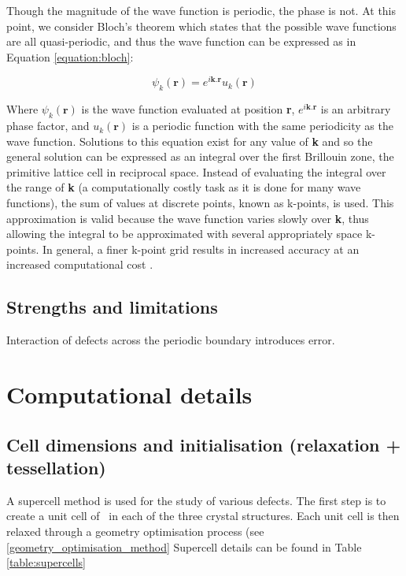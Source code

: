 Though the magnitude of the wave function is periodic, the phase is not. At this point, we consider Bloch's theorem which states that the possible wave functions are all quasi-periodic, and thus the wave function can be expressed as in Equation \ref{equation:bloch}: 

\begin{equation}
\label{equation:bloch}
\psi_k(\textbf{r}) = e^{i\textbf{k}.\textbf{r}}u_k(\textbf{r})
\end{equation}

Where $\psi_k(\textbf{r})$ is the wave function evaluated at position \textbf{r}, $e^{i\textbf{k}.\textbf{r}}$ is an arbitrary phase factor, and $u_k(\textbf{r})$ is a periodic function with the same periodicity as the wave function. Solutions to this equation exist for any value of \textbf{k} and so the general solution can be expressed as an integral over the first Brillouin zone, the primitive lattice cell in reciprocal space. Instead of evaluating the integral over the range of \textbf{k} (a computationally costly task as it is done for many wave functions), the sum of values at discrete points, known as k-points, is used. This approximation is valid because the wave function varies slowly over \textbf{k}, thus allowing the integral to be approximated with several appropriately space k-points. In general, a finer k-point grid results in increased accuracy at an increased computational cost \cite{Hasnip2010}.

\subsection{Strengths and limitations}

Interaction of defects across the periodic boundary introduces error.

\section{Computational details}
\subsection{Cell dimensions and initialisation (relaxation + tessellation)}

A supercell method is used for the study of various defects. The first step is to create a unit cell of \zirconia\ in each of the three crystal structures. Each unit cell is then relaxed through a geometry optimisation process (see \ref{geometry_optimisation_method}
Supercell details can be found in Table \ref{table:supercells}


